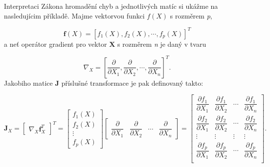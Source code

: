 Interpretaci Zákona hromadění chyb a jednotlivých matíc si ukážme na nasledujícim příkladě. Majme vektorvou funkci $f\left(X\right)$ s rozměrem \textit{p}, 

\begin{equation}
\mathbf{f}\left(X\right) = \left[f_{1}\left(X\right),f_{2}\left(X\right),\cdots , f_{p}\left(X\right) \right]^{T}
\end{equation}
a neť operátor gradient pro vektor $\mathbf{X}$ s rozměrem \textit{n} je daný v tvaru

\begin{equation}
\nabla_{X} = \left[\dfrac{\partial}{\partial X_{1}}, \dfrac{\partial}{\partial X_{2}}, \cdots, \dfrac{\partial}{\partial X_{n}}\right]^{T}.
\end{equation}
Jakobiho matice \textbf{J} příslušné transformace je pak definovaný takto:

\begin{equation}
\mathbf{J}_{X} = 
\begin{bmatrix}
\nabla_{X}\mathbf{f}_{X}^{T}
\end{bmatrix}^{T} = 
\begin{bmatrix}
f_{1}\left(X\right) \\
f_{2}\left(X\right) \\
\vdots \\
f_{p}\left(X\right)
\end{bmatrix} 
\begin{bmatrix}
\dfrac{\partial}{\partial X_{1}} & \dfrac{\partial}{\partial X_{2}} & \cdots &\dfrac{\partial}{\partial X_{n}}
\end{bmatrix} =
\begin{bmatrix}
\dfrac{\partial f_{1}}{\partial X_{1}} & \dfrac{\partial f_{1}}{\partial X_{2}} & \cdots & \dfrac{\partial f_{1}}{\partial X_{n}} \\
\dfrac{\partial f_{2}}{\partial X_{1}} & \dfrac{\partial f_{2}}{\partial X_{2}} & \cdots & \dfrac{\partial f_{2}}{\partial X_{n}} \\
\vdots & \vdots & \vdots & \vdots \\
\dfrac{\partial f_{p}}{\partial X_{1}} & \dfrac{\partial f_{p}}{\partial X_{2}} & \cdots & \dfrac{\partial f_{p}}{\partial X_{n}} \\
\end{bmatrix}.
\end{equation}

